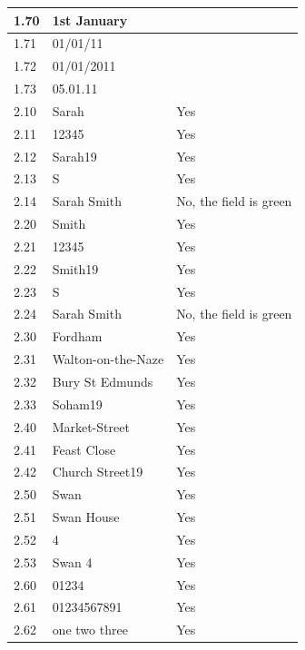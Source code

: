 \begin{center}
\begin{longtable}{|p{2cm}|p{5cm}|p{8cm}|}
        \rowcolor{darkgrey} 1.70 & 1st January &  \\ \hline
        \rowcolor{darkgrey} 1.71 & 01/01/11 &  \\ \hline
        \rowcolor{darkgrey} 1.72 & 01/01/2011 &  \\ \hline
        \rowcolor{darkgrey} 1.73 & 05.01.11 & \\ \hline
        
        2.10 & Sarah & Yes \\ \hline
        2.11 & 12345 & Yes \\ \hline
        2.12 & Sarah19 & Yes\\ \hline
        2.13 & S & Yes\\ \hline
        2.14 & Sarah Smith &  No, the field is green\\ \hline
        
        2.20 & Smith & Yes \\ \hline
        2.21 & 12345 & Yes \\ \hline
        2.22 & Smith19 & Yes \\ \hline
        2.23 & S & Yes \\ \hline
        2.24 & Sarah Smith & No, the field is green \\ \hline
        
        2.30 & Fordham & Yes \\ \hline
        2.31 & Walton-on-the-Naze & Yes \\ \hline
        2.32 & Bury St Edmunds & Yes \\ \hline
        2.33 & Soham19 & Yes\\ \hline

        2.40 & Market-Street & Yes \\ \hline
        2.41 & Feast Close & Yes \\ \hline
        2.42 & Church Street19 & Yes \\ \hline
        
        2.50 & Swan & Yes \\ \hline
        2.51 & Swan House & Yes \\ \hline
        2.52 & 4 & Yes\\ \hline
        2.53 & Swan 4 & Yes \\ \hline
        
        2.60 & 01234 & Yes \\ \hline
        2.61 & 01234567891 & Yes \\ \hline
        2.62 & one two three & Yes \\ \hline
       

\end{longtable}
\end{center}
